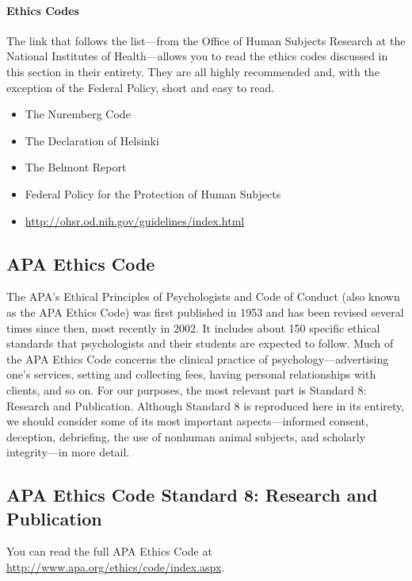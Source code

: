 \paragraph{Ethics Codes}
The link that follows the list---from the Office of Human Subjects Research at the National Institutes of Health---allows you to read the ethics codes discussed in this section in their entirety. They are all highly recommended and, with the exception of the Federal Policy, short and easy to read.
\begin{itemize}
\item The Nuremberg Code
\item The Declaration of Helsinki
\item The Belmont Report
\item Federal Policy for the Protection of Human Subjects
\item \url{http://ohsr.od.nih.gov/guidelines/index.html}
\end{itemize}






\subsection{APA Ethics Code}


The APA's Ethical Principles of Psychologists and Code of Conduct (also known as the APA Ethics Code) was first published in 1953 and has been revised several times since then, most recently in 2002. It includes about 150 specific ethical standards that psychologists and their students are expected to follow. Much of the APA Ethics Code concerns the clinical practice of psychology---advertising one's services, setting and collecting fees, having personal relationships with clients, and so on. For our purposes, the most relevant part is Standard 8: Research and Publication. Although Standard 8 is reproduced here in its entirety, we should consider some of its most important aspects---informed consent, deception, debriefing, the use of nonhuman animal subjects, and scholarly integrity---in more detail.


\newpage


\subsection{APA Ethics Code
Standard 8: Research and Publication}

You can read the full APA Ethics Code at \url{http://www.apa.org/ethics/code/index.aspx}.

